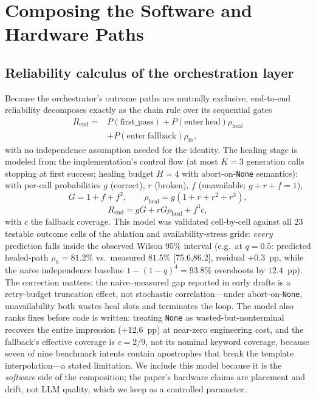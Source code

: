 \documentclass[journal,10pt,twocolumn]{IEEEtran}
\begin{document}
\section{Composing the Software and Hardware Paths}
\label{sec:e2e}
\subsection{Reliability calculus of the orchestration layer}
\label{sec:calculus}
Because the orchestrator's outcome paths are mutually exclusive, end-to-end reliability decomposes exactly as the
chain rule over its sequential gates
\begin{equation}\begin{split}
R_{\mathrm{end}}={}&P(\mathrm{first\_pass})+P(\mathrm{enter\ heal})\rho_{\mathrm{heal}}\\
&+P(\mathrm{enter\ fallback})\rho_{\mathrm{fb}},
\end{split}\label{eq:composition}
\end{equation}
with no independence assumption needed for the identity. The healing stage is modeled from the implementation's
control flow (at most $K{=}3$ generation calls stopping at first success; healing budget $H{=}4$ with
abort-on-\texttt{None} semantics): with per-call probabilities $g$ (correct), $r$ (broken), $f$ (unavailable;
$g{+}r{+}f{=}1$),
\begin{equation}
G=1+f+f^{2},\qquad \rho_{\mathrm{heal}}=g(1+r+r^{2}+r^{3}),
\label{eq:gamel}
\end{equation}
\begin{equation}
R_{\mathrm{end}}=gG+rG\rho_{\mathrm{heal}}+f^{3}c,
\label{eq:rheal}
\end{equation}
with $c$ the fallback coverage. This model was validated cell-by-cell against all 23 testable outcome cells of the
ablation and availability-stress grids: \emph{every} prediction falls inside the observed Wilson 95\% interval
(e.g.\ at $q{=}0.5$: predicted healed-path $\rho_h{=}81.2\%$ vs.\ measured $81.5\%$ [75.6,86.2], residual
$+0.3$~pp, while the naive independence baseline $1-(1-q)^{4}{=}93.8\%$ overshoots by $12.4$~pp). The correction
matters: the naive--measured gap reported in early drafts is a retry-budget truncation effect, not stochastic
correlation---under abort-on-\texttt{None}, unavailability both wastes heal slots and terminates the loop. The model
also ranks fixes before code is written: treating \texttt{None} as wasted-but-nonterminal recovers the entire
impression ($+12.6$~pp) at near-zero engineering cost, and the fallback's effective coverage is $c{=}2/9$, not its
nominal keyword coverage, because seven of nine benchmark intents contain apostrophes that break the template
interpolation---a stated limitation. We include this model because it is the \emph{software} side of the composition;
the paper's hardware claims are placement and drift, not LLM quality, which we keep as a controlled parameter.
\end{document}
